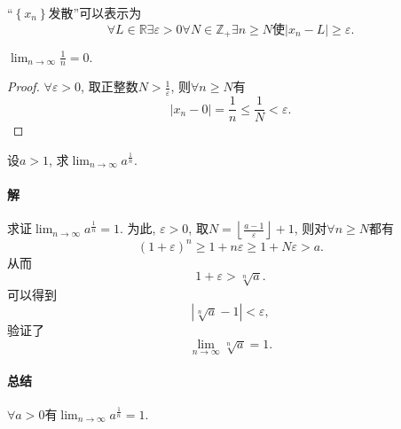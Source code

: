 ``$\left\{ x_n \right\} $发散''可以表示为
\begin{equation}
  \forall  L \in \mathbb{R} \exists \varepsilon > 0 \forall N\in \mathbb{Z}_{+} \exists n\ge N \text{使}|x_n - L| \ge \varepsilon.
\end{equation}

\begin{example}
    $\displaystyle \lim_{n \to \infty}\frac{1}{n} = 0.$
\end{example}
\begin{proof}
    $\forall \varepsilon > 0$, 取正整数$N > \frac{1}{\varepsilon}$, 则$\forall n\ge  N$有
    \begin{equation}
      |x_n - 0| = \frac{1}{n} \le \frac{1}{N} < \varepsilon.
    \end{equation}
\end{proof}

\begin{example}
    设$a>1$, 求$\displaystyle \lim_{n \to \infty}a^{\frac{1}{n}}$.

    \paragraph{解}
    求证$\displaystyle  \lim_{n \to \infty}a^{\frac{1}{n}} = 1$.
    为此, $\varepsilon>0$, 取$\displaystyle N = \left\lfloor \frac{a-1}{\varepsilon} \right\rfloor + 1$, 则对$\forall n\ge N$都有
    \begin{equation}
      \left( 1+\varepsilon  \right) ^{n} \ge 1+n\varepsilon \ge 1+ N\varepsilon >a.
    \end{equation}
    从而
    \begin{equation}
      1+\varepsilon > \sqrt[n]{a}.
    \end{equation}
    可以得到
    \begin{equation}
      \left| \sqrt[n]{a} -1 \right| < \varepsilon,
    \end{equation}
    验证了
    \begin{equation}
      \lim_{n \to \infty} \sqrt[n]{a} = 1.
    \end{equation}
\end{example}

\paragraph{总结}$\forall a>0$有$\displaystyle \lim_{n \to \infty}a^{\frac{1}{n}} = 1$.

